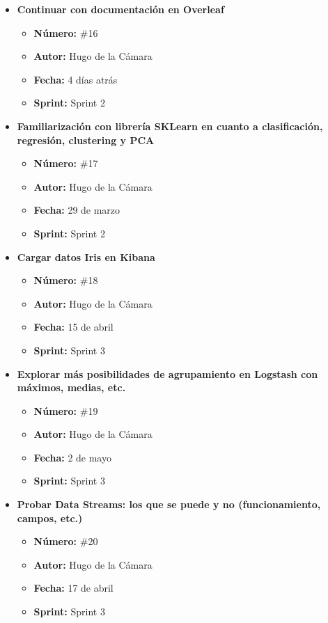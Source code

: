 \begin{itemize}
    \item \textbf{Continuar con documentación en Overleaf}
    \begin{itemize}
        \item \textbf{Número:} \#16
        \item \textbf{Autor:} Hugo de la Cámara
        \item \textbf{Fecha:} 4 días atrás
        \item \textbf{Sprint:} Sprint 2
    \end{itemize}
    
    \item \textbf{Familiarización con librería SKLearn en cuanto a clasificación, regresión, clustering y PCA}
    \begin{itemize}
        \item \textbf{Número:} \#17
        \item \textbf{Autor:} Hugo de la Cámara
        \item \textbf{Fecha:} 29 de marzo
        \item \textbf{Sprint:} Sprint 2
    \end{itemize}
    
    \item \textbf{Cargar datos Iris en Kibana}
    \begin{itemize}
        \item \textbf{Número:} \#18
        \item \textbf{Autor:} Hugo de la Cámara
        \item \textbf{Fecha:} 15 de abril
        \item \textbf{Sprint:} Sprint 3
    \end{itemize}
    
    \item \textbf{Explorar más posibilidades de agrupamiento en Logstash con máximos, medias, etc.}
    \begin{itemize}
        \item \textbf{Número:} \#19
        \item \textbf{Autor:} Hugo de la Cámara
        \item \textbf{Fecha:} 2 de mayo
        \item \textbf{Sprint:} Sprint 3
    \end{itemize}
    
    \item \textbf{Probar Data Streams: los que se puede y no (funcionamiento, campos, etc.)}
    \begin{itemize}
        \item \textbf{Número:} \#20
        \item \textbf{Autor:} Hugo de la Cámara
        \item \textbf{Fecha:} 17 de abril
        \item \textbf{Sprint:} Sprint 3
    \end{itemize}
    

\end{itemize}

